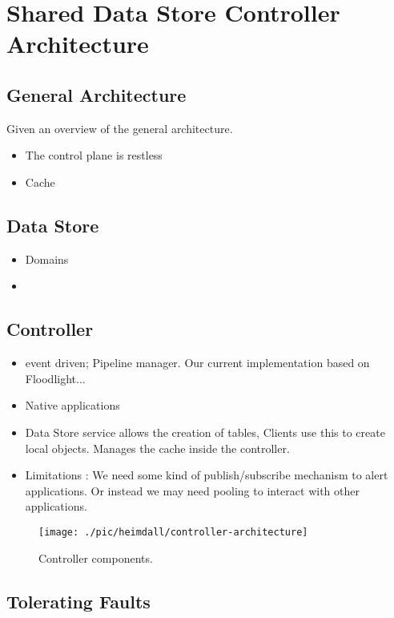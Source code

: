 
\section{Shared Data Store Controller Architecture} 
\glsresetall 

\subsection{General Architecture}
Given an overview of the general architecture. 

\begin{itemize}
\item The control plane is restless 
\item Cache 
\end{itemize}

\subsection{Data Store}
\begin{itemize}
\item Domains 
\item 
\end{itemize}
\subsection{Controller}

\begin{itemize}
\item event driven; Pipeline manager. Our current implementation based on Floodlight... 
\item Native applications 
\item Data Store service allows the creation of tables, Clients use this to create local objects. 
Manages the cache inside the controller. 
\item Limitations : We need some kind of publish/subscribe mechanism to alert applications. Or instead we may need pooling to interact with other applications. 
\end{itemize}


\begin{figure}
  \centering
  \texttt{[image: ./pic/heimdall/controller-architecture]}
  \caption{Controller components. }
  \label{fig:heimdall:architecture}
\end{figure}

\subsection{Tolerating Faults}

